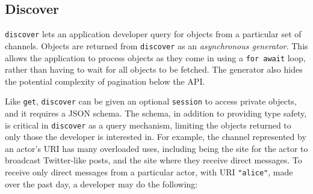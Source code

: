 




\subsection{Discover}

\texttt{discover} lets an application developer query for objects
from a particular set of channels.
Objects are returned from \texttt{discover} as an \emph{asynchronous generator}.
This allows the application to process objects as they come in
using a \texttt{for await} loop, rather than having to wait for all objects
to be fetched. The generator also hides the potential complexity of
pagination below the API.

Like \texttt{get}, \texttt{discover} can be given an optional \texttt{session}
to access private objects, and it requires a JSON schema.
The schema,
in addition to providing type safety, is critical in \texttt{discover}
as a query mechanism, limiting the objects returned to only those the developer is interested in.
For example, the channel represented by an actor's URI has many overloaded uses,
including being the site for the actor to broadcast Twitter-like posts,
and the site where they receive direct messages.
To receive only direct messages from a particular actor, with URI \texttt{"alice"}, made over
the past day, a developer may do the following:

